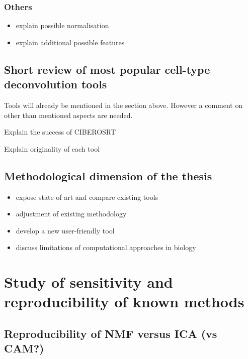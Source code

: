 \documentclass[12pt,]{book}
\providecommand{\tightlist}{%
  \setlength{\itemsep}{0pt}\setlength{\parskip}{0pt}}
\theoremstyle{definition}
\theoremstyle{definition}
\theoremstyle{definition}
\theoremstyle{remark}
\begin{document}
\hypertarget{others}{%
\subsection{Others}\label{others}}

\begin{itemize}
\tightlist
\item
  explain possible normalisation
\item
  explain additional possible features
\end{itemize}

\hypertarget{short-review-of-most-popular-cell-type-deconvolution-tools}{%
\section{Short review of most popular cell-type deconvolution
tools}\label{short-review-of-most-popular-cell-type-deconvolution-tools}}

Tools will already be mentioned in the section above. However a comment
on other than mentioned aspects are needed.

Explain the success of CIBEROSRT

Explain originality of each tool

\hypertarget{methodological-dimension-of-the-thesis}{%
\section{Methodological dimension of the
thesis}\label{methodological-dimension-of-the-thesis}}

\begin{itemize}
\tightlist
\item
  expose state of art and compare existing tools
\item
  adjustment of existing methodology
\item
  develop a new user-friendly tool
\item
  discuss limitations of computational approaches in biology
\end{itemize}

\hypertarget{sens}{%
\chapter{Study of sensitivity and reproducibility of known
methods}\label{sens}}

\hypertarget{reproducibility-of-nmf-versus-ica-vs-cam}{%
\section{Reproducibility of NMF versus ICA (vs
CAM?)}\label{reproducibility-of-nmf-versus-ica-vs-cam}}
\end{document}
